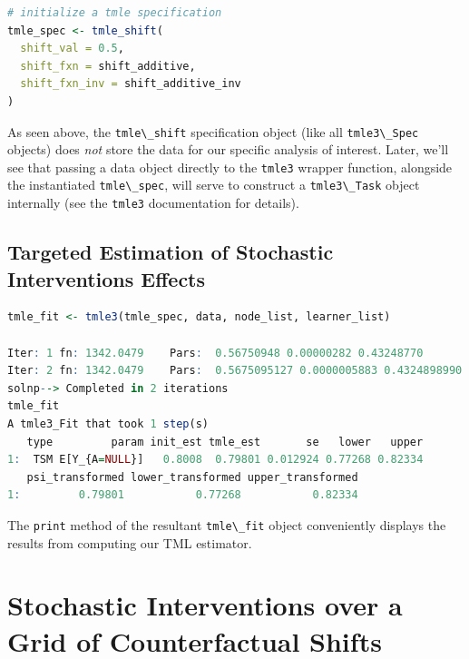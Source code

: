 \documentclass[
  12pt, krantz2,
]{book}
\newcommand{\passthrough}[1]{#1}
\theoremstyle{definition}
\theoremstyle{definition}
\theoremstyle{definition}
\newcommand{\1}{\mathbbm{1}}
\begin{document}
\begin{lstlisting}[language=R]
# initialize a tmle specification
tmle_spec <- tmle_shift(
  shift_val = 0.5,
  shift_fxn = shift_additive,
  shift_fxn_inv = shift_additive_inv
)
\end{lstlisting}

As seen above, the \passthrough{\lstinline!tmle\_shift!} specification object (like all \passthrough{\lstinline!tmle3\_Spec!}
objects) does \emph{not} store the data for our specific analysis of interest. Later,
we'll see that passing a data object directly to the \passthrough{\lstinline!tmle3!} wrapper function,
alongside the instantiated \passthrough{\lstinline!tmle\_spec!}, will serve to construct a \passthrough{\lstinline!tmle3\_Task!}
object internally (see the \passthrough{\lstinline!tmle3!} documentation for details).

\hypertarget{targeted-estimation-of-stochastic-interventions-effects}{%
\subsection{Targeted Estimation of Stochastic Interventions Effects}\label{targeted-estimation-of-stochastic-interventions-effects}}

\begin{lstlisting}[language=R]
tmle_fit <- tmle3(tmle_spec, data, node_list, learner_list)

Iter: 1 fn: 1342.0479    Pars:  0.56750948 0.00000282 0.43248770
Iter: 2 fn: 1342.0479    Pars:  0.5675095127 0.0000005883 0.4324898990
solnp--> Completed in 2 iterations
tmle_fit
A tmle3_Fit that took 1 step(s)
   type         param init_est tmle_est       se   lower   upper
1:  TSM E[Y_{A=NULL}]   0.8008  0.79801 0.012924 0.77268 0.82334
   psi_transformed lower_transformed upper_transformed
1:         0.79801           0.77268           0.82334
\end{lstlisting}

The \passthrough{\lstinline!print!} method of the resultant \passthrough{\lstinline!tmle\_fit!} object conveniently displays the
results from computing our TML estimator.

\hypertarget{stochastic-interventions-over-a-grid-of-counterfactual-shifts}{%
\section{Stochastic Interventions over a Grid of Counterfactual Shifts}\label{stochastic-interventions-over-a-grid-of-counterfactual-shifts}}
\end{document}
